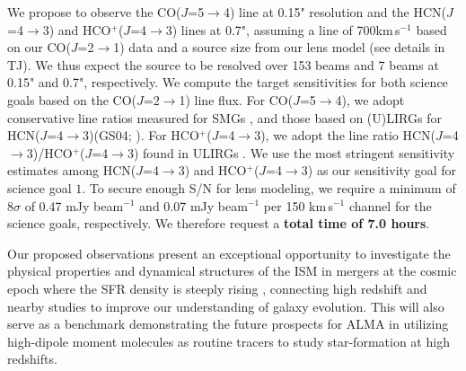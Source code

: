 \documentclass[12pt,a4paper]{article}
\newcommand{\LIR}{\mbox{$L_{\rm IR}$}\xspace}
\newcommand{\rarr}{$\rightarrow$}
\newcommand{\bco}{\mbox{CO($J$=2\rarr1)}\xspace}
\newcommand{\eco}{\mbox{CO($J$=5\rarr4)}\xspace}
\newcommand{\dhcn}{HCN($J$=4\rarr3)\xspace}
\newcommand{\hcop}{HCO$^+$\xspace}
\newcommand{\dhcop}{HCO$^+$($J$=4\rarr3)\xspace}
\newcommand{\kms}{km\,s$^{-1}$\xspace}
\newcommand{\pmOne}{\mbox{$^{-1}$}\xspace}
\begin{document}
We propose to observe the \eco line at 0.15" resolution
and the \dhcn and \dhcop lines at 0.7", assuming a line 
of 700\kms based on our \bco data
and a source size from our lens model (see details in TJ).
We thus expect the source to be resolved over 153 beams 
and 7 beams at 0.15" and 0.7", respectively. 
We compute the target sensitivities for both science goals based on the \bco line flux. 
For \eco, we adopt conservative 
line ratios measured for SMGs \citep[][see TJ for details]{CW13},
and those based on (U)LIRGs for \dhcn (GS04; \citealt{Papadopoulos07a}).
For \dhcop, we adopt the line ratio \dhcn/\dhcop found in ULIRGs 
\citep{Greve09a}. 
We use the most stringent sensitivity estimates 
among \dhcn and \dhcop as our sensitivity goal for science goal $1$. %
To secure enough S/N for lens modeling, 
we require a minimum of 8$\sigma$ of 0.47 mJy beam\pmOne and 0.07 mJy beam\pmOne
per 150 \kms channel 
for the science goals, respectively. 
We therefore request a \textbf{total time of 7.0 hours}.%

\par 
Our proposed observations present an exceptional opportunity to investigate
the physical properties and dynamical structures of 
the ISM in mergers at the cosmic epoch 
where the SFR density is steeply rising \citep{LeFloch05a}, 
connecting high redshift and nearby studies to improve our understanding of galaxy evolution.
%
This will also %
serve as a benchmark demonstrating the future prospects for ALMA in 
utilizing high-dipole moment molecules as routine tracers to study star-formation 
at high redshifts.
\end{document}

